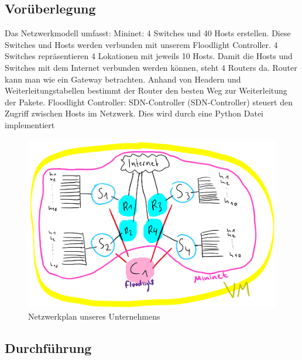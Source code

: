\documentclass[fontsize=12pt,paper=a4,open=any,parskip=half,
  twoside=false,toc=listof,toc=bibliography,fleqn,leqno,
  captions=nooneline,captions=tableabove,british]{scrbook}
\begin{document}
\subsection{Vorüberlegung}
Das Netzwerkmodell umfasst:
Mininet: 4 Switches und 40 Hosts erstellen. Diese Switches und Hosts werden verbunden mit unserem Floodlight Controller. 4 Switches repräsentieren 4 Lokationen mit jeweils 10 Hosts. Damit die Hosts und Switches mit dem Internet verbunden werden können, steht 4 Routers da. Router kann man wie ein Gateway betrachten. Anhand von Headern und Weiterleitungstabellen bestimmt der Router den besten Weg zur Weiterleitung der Pakete.
Floodlight Controller: SDN-Controller (SDN-Controller) steuert den Zugriff zwischen Hosts im Netzwerk. Dies wird durch eine Python Datei implementiert

\begin{figure}[htbp]
 \centering
 \includegraphics[width=1.0\textwidth]{Bilder/prototyp}
 \captionsetup{justification=centering,margin=2cm}
 \caption{Netzwerkplan unseres Unternehmens}
 \label{networkplan}
\end{figure}

\subsection{Durchführung}
\end{document}

